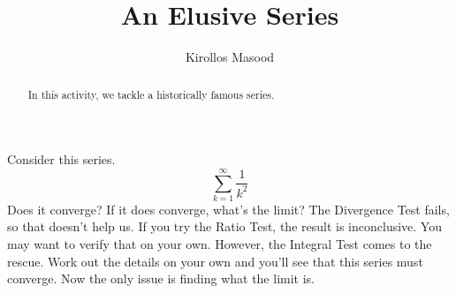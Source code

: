 \documentclass{ximera}
\title{An Elusive Series}
\author{Kirollos Masood}
\begin{document}
\begin{abstract}
In this activity, we tackle a historically famous series.
\end{abstract}
\maketitle

Consider this series.
\[
	\sum_{k=1}^{\infty} \frac{1}{k^2}
\]
Does it converge? If it does converge, what's the limit? The Divergence Test fails, so that doesn't help us. If you try the Ratio Test, the result is inconclusive. You may want to verify that on your own. However, the Integral Test comes to the rescue. Work out the details on your own and you'll see that this series must converge. Now the only issue is finding what the limit is.
\end{document}

